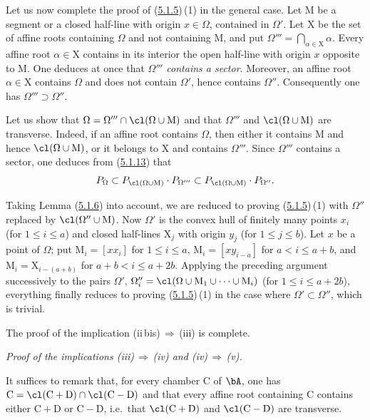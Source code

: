 \documentclass[12pt,a4paper,oneside,english]{smfart}
\makeatletter
\newcommand{\btanchor}[1]{\leavevmode\Hy@raisedlink{\hypertarget{bt:#1}{}}}
\newcommand{\btref}[1]{\hyperlink{bt:#1}{#1}}
\theoremstyle{definition}
\theoremstyle{bt}
\makeatother
\begin{document}
\btanchor{5.1.14}
Let us now complete the proof of (\btref{5.1.5})\,(1) in the general case. Let
$\mathrm{M}$ be a segment or a closed half-line with origin $x\in\Omega$,
contained in $\Omega'$. Let $\mathrm{X}$ be the set of affine roots containing
$\Omega$ and not containing $\mathrm{M}$, and put
$\Omega'''=\bigcap_{\alpha\in \mathrm{X}}\alpha$. Every affine root
$\alpha\in \mathrm{X}$ contains in its interior the open half-line with origin
$x$ opposite to $\mathrm{M}$. One deduces at once that \emph{$\Omega'''$
contains a sector}. Moreover, an affine root $\alpha\in \mathrm{X}$ contains
$\Omega$ and does not contain $\Omega'$, hence contains $\Omega''$.
Consequently one has $\Omega'''\supset\Omega''$.

Let us show that $\Omega=\Omega'''\cap\cl(\Omega\cup \mathrm{M})$ and that
$\Omega'''$ and $\cl(\Omega\cup \mathrm{M})$ are transverse. Indeed, if an
affine root contains $\Omega$, then either it contains $\mathrm{M}$ and hence
$\cl(\Omega\cup \mathrm{M})$, or it belongs to $\mathrm{X}$ and contains
$\Omega'''$. Since $\Omega'''$ contains a sector, one deduces from (\btref{5.1.13}) that
\[
P_{\Omega}\subset P_{\cl(\Omega\cup \mathrm{M})}\cdot P_{\Omega'''}
\subset P_{\cl(\Omega\cup \mathrm{M})}\cdot P_{\Omega''}.
\]

Taking Lemma (\btref{5.1.6}) into account, we are reduced to proving (\btref{5.1.5})\,(1) with
$\Omega''$ replaced by $\cl(\Omega''\cup \mathrm{M})$. Now $\Omega'$ is the
convex hull of finitely many points $x_{i}$ (for $1\leqslant i\leqslant a$) and
closed half-lines $\mathrm{X}_{j}$ with origin $y_{j}$ (for
$1\leqslant j\leqslant b$). Let $x$ be a point of $\Omega$; put
$\mathrm{M}_{i}=[xx_{i}]$ for $1\leqslant i\leqslant a$,
$\mathrm{M}_{i}=[xy_{i-a}]$ for $a<i\leqslant a+b$, and
$\mathrm{M}_{i}=\mathrm{X}_{i-(a+b)}$ for $a+b<i\leqslant a+2b$. Applying the
preceding argument successively to the pairs $\Omega'$,
$\Omega''_{i}=\cl(\Omega\cup \mathrm{M}_{1}\cup\dots\cup \mathrm{M}_{i})$ (for
$1\leqslant i\leqslant a+2b$), everything finally reduces to proving
(\btref{5.1.5})\,(1) in the case where $\Omega'\subset\Omega''$, which is trivial.

The proof of the implication (ii\,bis)\,$\Rightarrow$\,(iii) is complete.

\btanchor{5.1.15}
\emph{Proof of the implications \textup{(iii)}\,$\Rightarrow$\,\textup{(iv)} and
\textup{(iv)}\,$\Rightarrow$\,\textup{(v)}.}

It suffices to remark that, for every chamber $\mathrm{C}$ of $\bA$, one has
$\mathrm{C}=\cl(\mathrm{C}+\mathrm{D})\cap\cl(\mathrm{C}-\mathrm{D})$ and that
every affine root containing $\mathrm{C}$ contains either
$\mathrm{C}+\mathrm{D}$ or $\mathrm{C}-\mathrm{D}$, i.e.\ that
$\cl(\mathrm{C}+\mathrm{D})$ and $\cl(\mathrm{C}-\mathrm{D})$ are transverse.
\end{document}
